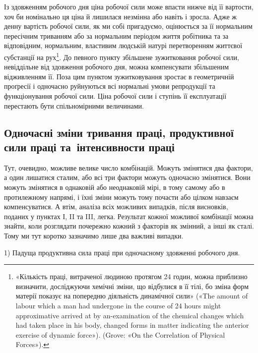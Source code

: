 Із здовженням робочого дня ціна робочої сили може впасти
нижче від її вартости, хоч би номінально ця ціна й лишилася
незмінна або навіть і зросла. Адже ж денну вартість робочої сили,
як ми собі пригадуємо, оцінюється за її нормальним пересічним
триванням або за нормальним періодом життя робітника та за
відповідним, нормальним, властивим людській натурі перетворенням
життєвої субстанції на рух\footnote{
«Кількість праці, витраченої людиною протягом 24 годин, можна
приблизно визначити, досліджуючи хемічні зміни, що відбулися в її
тілі, бо зміна форм матерії показує на попередню діяльність динамічної
сили» («The amount of labour which a man had undergone in the course
of 24 hours might approximative arrived at by an-examination of the
chemical changes which had taken place in his body, changed forms in
matter indicating the anterior exercise of dynamic force»). (Grove: «On
the Correlation of Physical Forces»).
}. До певного пункту збільшене
зужитковання робочої сили, невіддільне від здовження
робочого дня, можна компенсувати збільшеним відживленням її.
Поза цим пунктом зужитковування зростає в геометричній проґресії
і одночасно руйнуються всі нормальні умови репродукції
та функціонування робочої сили. Ціна робочої сили і ступінь
її експлуатації перестають бути спільномірними величинами.

\subsection{Одночасні зміни тривання праці, продуктивної сили праці
та~інтенсивности праці}

Тут, очевидно, можливе велике число комбінацій. Можуть
змінятися два фактори, а один лишатися сталим, або всі три фактори
можуть одночасно змінятися. Вони можуть змінятися в
однаковій або неоднаковій мірі, в тому самому або в протилежному
напрямі, і їхні зміни можуть тому почасти або цілком
навзаєм компенсуватися. А втім, аналіза всіх можливих випадків,
після висновків, поданих у пунктах І, II та III, легка. Результат
кожної можливої комбінації можна знайти, коли розглядати
почережно кожний з факторів як змінний, а інші як сталі.
Тому ми тут коротко зазначимо лише два важливі випадки.

1) Падуща продуктивна сила праці при одночасному здовженні
робочого дня.

